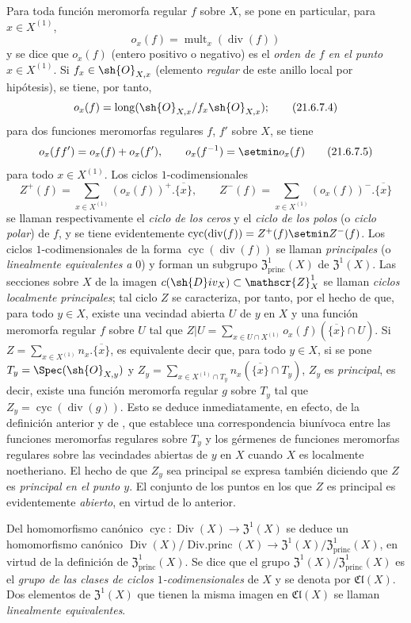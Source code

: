 \begin{env}[21.6.7]
Para toda función meromorfa regular $f$ sobre $X$, se pone en particular, para $x\in X^{(1)}$,
\[
\label{IV.21.6.7.3}
  o_x(f)=\operatorname{mult}_x(\operatorname{div}(f))
  \tag{21.6.7.3}
\]
y se dice que $o_x(f)$ (entero positivo o negativo) es el \emph{orden de $f$ en el punto} $x\in X^{(1)}$.
Si $f_x\in\sh{O}_{X,x}$ (elemento \emph{regular} de este anillo local por hipótesis), se tiene, por tanto,
\[
\label{IV.21.6.7.4}
  o_x(f)=\operatorname{long}(\sh{O}_{X,x}/f_x\sh{O}_{X,x});
  \tag{21.6.7.4}
\]
para dos funciones meromorfas regulares $f$, $f'$ sobre $X$, se tiene
\[
\label{IV.21.6.7.5}
  o_x(ff')=o_x(f)+o_x(f'),\qquad o_x(f^{-1})=\setmin o_x(f)
  \tag{21.6.7.5}
\]
para todo $x\in X^{(1)}$.
Los ciclos $1$-codimensionales
\[
  Z^+(f)=\sum_{x\in X^{(1)}}(o_x(f))^+.\overline{\{x\}},\qquad
  Z^-(f)=\sum_{x\in X^{(1)}}(o_x(f))^-.\overline{\{x\}}
\]
se llaman respectivamente el \emph{ciclo de los ceros} y el \emph{ciclo de los polos} (o \emph{ciclo polar}) de $f$, y se tiene evidentemente $\operatorname{cyc}(\operatorname{div}(f))=Z^+(f)\setmin Z^-(f)$.
Los ciclos $1$-codimensionales de la forma $\operatorname{cyc}(\operatorname{div}(f))$ se llaman \emph{principales} (o \emph{linealmente equivalentes a} $0$) y forman un subgrupo $\mathfrak{Z}^1_\mathrm{princ}(X)$ de $\mathfrak{Z}^1(X)$.
Las secciones sobre $X$ de la imagen $c(\sh{D}iv_X)\subset\mathscr{Z}_X^1$ se
llaman \emph{ciclos localmente principales};
tal ciclo $Z$ se caracteriza, por tanto, por el hecho de que, para todo $y\in X$, existe una vecindad abierta $U$ de $y$ en $X$ y una función meromorfa regular $f$ sobre $U$ tal que $Z|U=\sum_{x\in U\cap X^{(1)}}o_x(f)(\overline{\{x\}}\cap U)$.
Si $Z=\sum_{x\in X^{(1)}}n_x.\overline{\{x\}}$, es equivalente decir que, para todo $y\in X$, si se pone $T_y=\Spec(\sh{O}_{X,y})$ y $Z_y=\sum_{x\in X^{(1)}\cap T_y}n_x(\overline{\{x\}}\cap T_y)$, $Z_y$ es \emph{principal}, es decir, existe una función meromorfa regular $g$ sobre $T_y$ tal que $Z_y=\operatorname{cyc}(\operatorname{div}(g))$.
Esto se deduce inmediatamente, en efecto, de la definición anterior y de , que establece una correspondencia biunívoca entre las funciones meromorfas regulares sobre $T_y$ y los gérmenes de funciones meromorfas regulares sobre las vecindades abiertas de $y$ en $X$ cuando $X$ es localmente noetheriano.
El hecho de que $Z_y$ sea principal se expresa también diciendo que $Z$ es \emph{principal en el punto $y$}.
El conjunto de los puntos en los que $Z$ es principal es evidentemente \emph{abierto}, en virtud de lo anterior.

Del homomorfismo canónico $\operatorname{cyc}:\operatorname{Div}(X)\to\mathfrak{Z}^1(X)$ se deduce un homomorfismo canónico $\operatorname{Div}(X)/\operatorname{Div.princ}(X)\to\mathfrak{Z}^1(X)/\mathfrak{Z}^1_\mathrm{princ}(X)$, en virtud de la definición de $\mathfrak{Z}^1_\mathrm{princ}(X)$.
Se dice que el grupo $\mathfrak{Z}^1(X)/\mathfrak{Z}^1_\mathrm{princ}(X)$ es el \emph{grupo de las clases de ciclos $1$-codimensionales} de $X$ y se denota por $\mathfrak{Cl}(X)$.
Dos elementos de $\mathfrak{Z}^1(X)$ que tienen la misma imagen en $\mathfrak{Cl}(X)$ se llaman \emph{linealmente equivalentes}.
\end{env}

